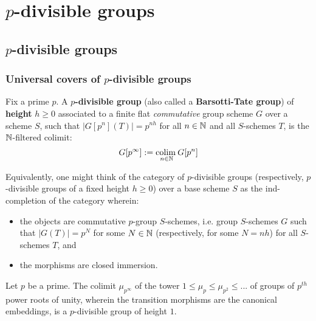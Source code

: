 \section{\texorpdfstring{$p$}{}-divisible groups}
    \subsection{\texorpdfstring{$p$}{}-divisible groups}
        \subsubsection{Universal covers of \texorpdfstring{$p$}{}-divisible groups}
            \begin{definition} \label{def: p_divisible_groups}
                Fix a prime $p$. A \textbf{$p$-divisible group} (also called a \textbf{Barsotti-Tate group}) of \textbf{height} $h \geq 0$ associated to a finite flat \textit{commutative} group scheme $G$ over a scheme $S$, such that $|G[p^n](T)| = p^{nh}$ for all $n \in \mathbb{N}$ and all $S$-schemes $T$, is the $\mathbb{N}$-filtered colimit:
                    $$G[p^{\infty}] := \underset{n \in \mathbb{N}}{\operatorname{colim} \:} G[p^n]$$
            \end{definition}
            \begin{remark}
                Equivalently, one might think of the category of $p$-divisible groups (respectively, $p$-divisible groups of a fixed height $h \geq 0$) over a base scheme $S$ as the ind-completion of the category wherein:
                    \begin{itemize}
                        \item the objects are commutative $p$-group $S$-schemes, i.e. group $S$-schemes $G$ such that $|G(T)| = p^N$ for some $N \in \mathbb{N}$ (respectively, for some $N = nh$) for all $S$-schemes $T$, and
                        \item the morphisms are closed immersion.
                    \end{itemize}
            \end{remark}
            \begin{example}
                Let $p$ be a prime. The colimit $\mu_{p^{\infty}}$ of the tower $1 \leq \mu_p \leq \mu_{p^2} \leq ...$ of groups of $p^{th}$ power roots of unity, wherein the transition morphisms are the canonical embeddings, is a $p$-divisible group of height $1$. 
            \end{example}
